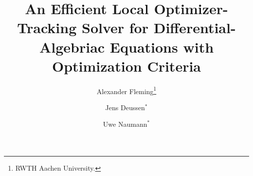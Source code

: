 \documentclass[twoside,leqno, twocolumn]{article}
\begin{document}
%
\newcommand\relatedversion{}



\title{\Large An Efficient Local Optimizer-Tracking Solver for Differential-Algebriac Equations with Optimization Criteria\relatedversion}
\author{Alexander Fleming\thanks{RWTH Aachen University.}
\and Jens Deussen$^*$
\and Uwe Naumann$^*$}

\date{}

\maketitle






\end{document}
